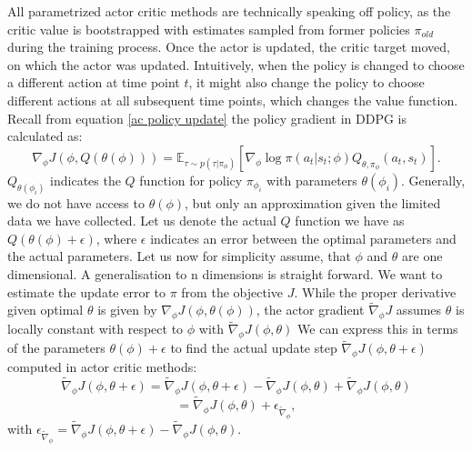 All parametrized actor critic methods are technically speaking off policy, as the critic value is bootstrapped with estimates sampled from former policies $\pi_{old}$ during the training process. 
Once the actor is updated, the 
critic target moved, on which the actor was updated. Intuitively, when the policy is changed to choose a different action at time point $t$, it might also change 
the policy to choose different actions at 
all subsequent time points, which changes the value function. \\

Recall from equation \ref{ac policy update} the policy gradient in DDPG is calculated as:
\begin{equation}
    \nabla_{\phi} J(\phi, Q(\theta(\phi))) = \mathbb{E}_{\tau \sim p(\tau | \pi_{\phi})} \left[\nabla_{\phi} \log \pi(a_t|s_t;\phi) Q_{\theta, \pi_\phi}(a_t, s_t) \right].
\end{equation}
$Q_{\theta(\phi_i)}$ indicates the $Q$ function for policy $\pi_{\phi_{i}}$ with parameters 
$\theta(\phi_i)$. 
Generally, we do not have access to $\theta(\phi)$, but only an approximation given the limited data we have collected. Let us denote the actual 
$Q$ function we have as $Q(\theta(\phi) + \epsilon)$, where $\epsilon$ indicates an error between the optimal parameters and the actual parameters.
Let us now for simplicity assume, that $\phi$ and $\theta$ are one dimensional. A generalisation to n dimensions is straight forward. We want 
to estimate the update error to $\pi$ from the objective $J$. While the proper derivative given optimal $\theta$ is given by $\nabla_{\phi} J(\phi, \theta(\phi))$,
the actor gradient $\widetilde{\nabla}_\phi J$ assumes $\theta$ is locally constant with respect to $\phi$ with $\widetilde{\nabla}_\phi J(\phi, \theta)$ 
We can express this in terms of the parameters $\theta(\phi) + \epsilon$ to 
find the actual update step $\widetilde{\nabla}_{\phi} J(\phi, \theta + \epsilon)$ computed in actor critic methods:
\begin{equation*}
    \widetilde{\nabla}_{\phi} J(\phi, \theta + \epsilon) = \widetilde{\nabla}_{\phi} J(\phi, \theta + \epsilon) - \widetilde{\nabla}_{\phi} J(\phi, \theta) + \widetilde{\nabla}_{\phi} J(\phi, \theta)
\end{equation*}
\begin{equation*}
    = \widetilde{\nabla}_{\phi} J(\phi, \theta) + \epsilon_{\widetilde{\nabla}_{\phi}},
\end{equation*}
with $\epsilon_{\widetilde{\nabla}_{\phi}} = \widetilde{\nabla}_{\phi} J(\phi, \theta + \epsilon) - \widetilde{\nabla}_{\phi} J(\phi, \theta)$.
